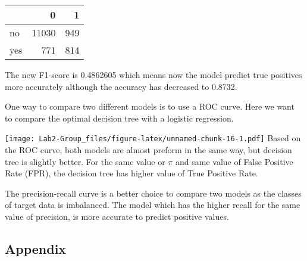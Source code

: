 \documentclass[
]{article}
\begin{document}
\begin{longtable}[]{@{}lrr@{}}
\toprule()
& 0 & 1 \\
\midrule()
\endhead
no & 11030 & 949 \\
yes & 771 & 814 \\
\bottomrule()
\end{longtable}

The new F1-score is 0.4862605 which means now the model predict true
positives more accurately although the accuracy has decreased to 0.8732.

One way to compare two different models is to use a ROC curve. Here we
want to compare the optimal decision tree with a logistic regression.

\texttt{[image: Lab2-Group\_files/figure-latex/unnamed-chunk-16-1.pdf]}
Based on the ROC curve, both models are almost preform in the same way,
but decision tree is slightly better. For the same value or \(\pi\) and
same value of False Positive Rate (FPR), the decision tree has higher
value of True Positive Rate.

The precision-recall curve is a better choice to compare two models as
the classes of target data is imbalanced. The model which has the higher
recall for the same value of precision, is more accurate to predict
positive values.

\newpage

\hypertarget{appendix}{%
\subsection{Appendix}\label{appendix}}
\end{document}
